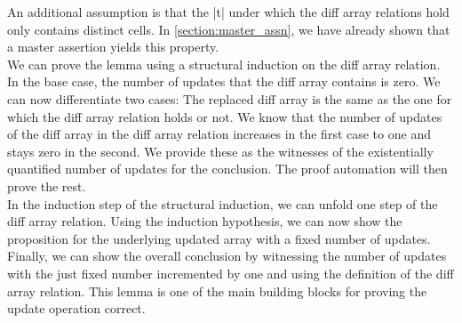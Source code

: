 \noindent An additional assumption is that the |t| under which the diff array relations hold only contains distinct cells. In \autoref{section:master_assn}, we have already shown that a master assertion yields this property.\\
We can prove the lemma using a structural induction on the diff array relation. In the base case, the number of updates that the diff array contains is zero. We can now differentiate two cases: The replaced diff array is the same as the one for which the diff array relation holds or not. We know that the number of updates of the diff array in the diff array relation increases in the first case to one and stays zero in the second. We provide these as the witnesses of the existentially quantified number of updates for the conclusion. The proof automation will then prove the rest.\\
In the induction step of the structural induction, we can unfold one step of the diff array relation. Using the induction hypothesis, we can now show the proposition for the underlying updated array with a fixed number of updates. Finally, we can show the overall conclusion by witnessing the number of updates with the just fixed number incremented by one and using the definition of the diff array relation. This lemma is one of the main building blocks for proving the update operation correct.

